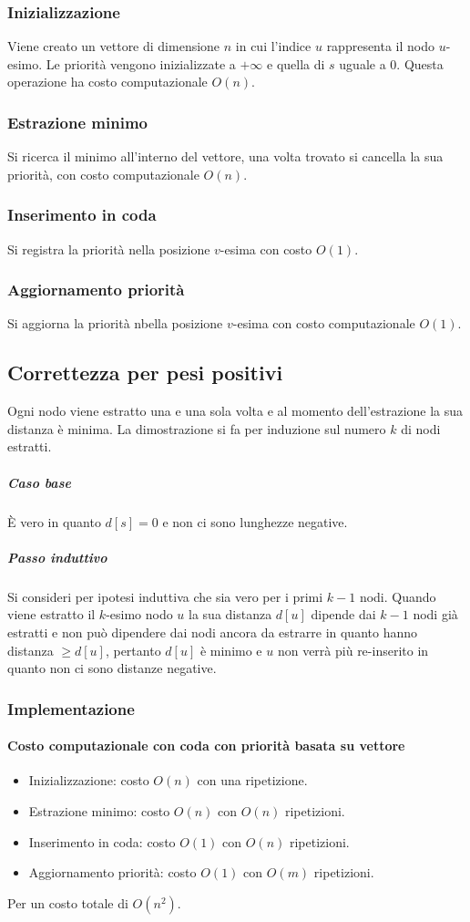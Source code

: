 \subsubsection{Inizializzazione}
Viene creato un vettore di dimensione $n$ in cui l'indice $u$ rappresenta il nodo $u$-esimo. Le priorit\`a vengono inizializzate a $+\infty$ e quella di $s$ uguale a $0$. Questa 
operazione ha costo computazionale $O(n)$.
\subsubsection{Estrazione minimo}
Si ricerca il minimo all'interno del vettore, una volta trovato si cancella la sua priorit\`a, con costo computazionale $O(n)$. 
\subsubsection{Inserimento in coda}
Si registra la priorit\`a nella posizione $v$-esima con costo $O(1)$.
\subsubsection{Aggiornamento priorit\`a}
Si aggiorna la priorit\`a nbella posizione $v$-esima con costo computazionale $O(1)$.
\subsection{Correttezza per pesi positivi}
Ogni nodo viene estratto una e una sola volta e al momento dell'estrazione la sua distanza \`e minima. La dimostrazione si fa per induzione sul numero $k$ di nodi estratti.
\subparagraph{Caso base}
\`E vero in quanto $d[s]=0$ e non ci sono lunghezze negative.
\subparagraph{Passo induttivo}
Si consideri per ipotesi induttiva che sia vero per i primi $k-1$ nodi. Quando viene estratto il $k$-esimo nodo $u$ la sua distanza $d[u]$ dipende dai $k-1$ nodi gi\`a estratti e non 
pu\`o dipendere dai nodi ancora da estrarre in quanto hanno distanza $\ge d[u]$, pertanto $d[u]$ \`e minimo e $u$ non verr\`a pi\`u re-inserito in quanto non ci sono distanze negative.
\subsubsection{Implementazione}

\paragraph{Costo computazionale con coda con priorit\`a basata su vettore}
\begin{itemize}
	\item Inizializzazione: costo $O(n)$ con una ripetizione.
	\item Estrazione minimo: costo $O(n)$ con $O(n)$ ripetizioni.
	\item Inserimento in coda: costo $O(1)$ con $O(n)$ ripetizioni.
	\item Aggiornamento priorit\`a: costo $O(1)$ con $O(m)$ ripetizioni.
\end{itemize}
Per un costo totale di $O(n^2)$.
